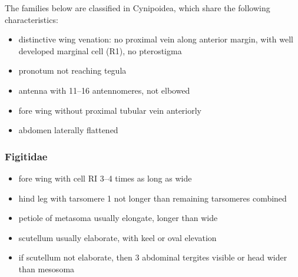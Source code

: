 \documentclass[letterpaper, 11pt]{article}
\begin{document}
\noindent{}The families below are classified in Cynipoidea, which share the following characteristics:
\begin{itemize}
\item distinctive wing venation: no proximal vein along anterior margin, with well developed marginal cell (R1), no pterostigma
\item pronotum not reaching tegula
\item antenna with 11--16 antennomeres, not elbowed
\item fore wing without proximal tubular vein anteriorly
\item abdomen laterally flattened
\end{itemize}

\subsubsection{Figitidae}
\begin{itemize}
\item fore wing with cell RI 3--4 times as long as wide
\item hind leg with tarsomere 1 not longer than remaining tarsomeres combined
\item petiole of metasoma usually elongate, longer than wide
\item scutellum usually elaborate, with keel or oval elevation
\item if scutellum not elaborate, then 3 abdominal tergites visible or head wider than mesosoma
\end{itemize}
\end{document}
